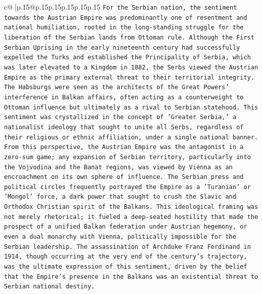 \documentclass{article}
\begin{document}
{\begin{supertabular}{c@{$\;$}|p{.15\linewidth}@{}p{.15\linewidth}p{.15\linewidth}p{.15\linewidth}p{.15\linewidth}p{.15\linewidth}}
{{{\texttt{For the Serbian nation, the sentiment towards the Austrian Empire was predominantly one of resentment and national humiliation, rooted in the long{-}standing struggle for the liberation of the Serbian lands from Ottoman rule. Although the First Serbian Uprising in the early nineteenth century had successfully expelled the Turks and established the Principality of Serbia, which was later elevated to a Kingdom in 1882, the Serbs viewed the Austrian Empire as the primary external threat to their territorial integrity. The Habsburgs were seen as the architects of the Great Powers' interference in Balkan affairs, often acting as a counterweight to Ottoman influence but ultimately as a rival to Serbian statehood. This sentiment was crystallized in the concept of 'Greater Serbia,' a nationalist ideology that sought to unite all Serbs, regardless of their religious or ethnic affiliation, under a single national banner. From this perspective, the Austrian Empire was the antagonist in a zero{-}sum game; any expansion of Serbian territory, particularly into the Vojvodina and the Banat regions, was viewed by Vienna as an encroachment on its own sphere of influence. The Serbian press and political circles frequently portrayed the Empire as a 'Turanian' or 'Mongol' force, a dark power that sought to crush the Slavic and Orthodox Christian spirit of the Balkans. This ideological framing was not merely rhetorical; it fueled a deep{-}seated hostility that made the prospect of a unified Balkan federation under Austrian hegemony, or even a dual monarchy with Vienna, politically impossible for the Serbian leadership. The assassination of Archduke Franz Ferdinand in 1914, though occurring at the very end of the century's trajectory, was the ultimate expression of this sentiment, driven by the belief that the Empire's presence in the Balkans was an existential threat to Serbian national destiny.} \\
\\ 
}}}
\end{supertabular}}
\end{document}
